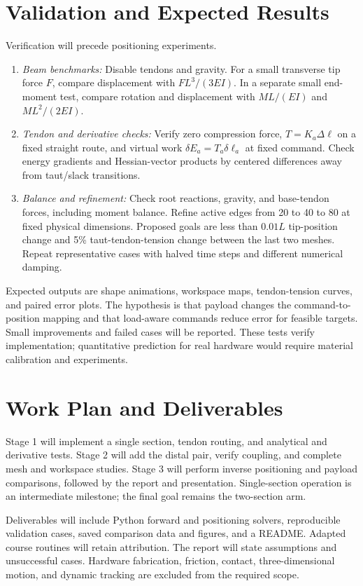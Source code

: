 \documentclass[letterpaper,10pt,conference]{ieeeconf}
\begin{document}
\section{Validation and Expected Results}
Verification will precede positioning experiments.
\begin{enumerate}
\item \textit{Beam benchmarks:} Disable tendons and gravity. For a
small transverse tip force $F$, compare displacement with
$FL^3/(3EI)$. In a separate small end-moment test, compare rotation
and displacement with $ML/(EI)$ and $ML^2/(2EI)$.
\item \textit{Tendon and derivative checks:} Verify zero compression
force, $T=K_a\Delta\ell$ on a fixed straight route, and virtual work
$\delta E_a=T_a\delta\ell_a$ at fixed command. Check energy gradients
and Hessian-vector products by centered differences away from
taut/slack transitions.
\item \textit{Balance and refinement:} Check root reactions, gravity,
and base-tendon forces, including moment balance. Refine active edges
from 20 to 40 to 80 at fixed physical dimensions. Proposed goals are
less than $0.01L$ tip-position change and 5\% taut-tendon-tension
change between the last two meshes. Repeat representative cases with
halved time steps and different numerical damping.
\end{enumerate}
Expected outputs are shape animations, workspace maps, tendon-tension
curves, and paired error plots. The hypothesis is that payload changes
the command-to-position mapping and that load-aware commands reduce
error for feasible targets. Small improvements and failed cases will
be reported. These tests verify implementation; quantitative prediction
for real hardware would require material calibration and experiments.

\section{Work Plan and Deliverables}
Stage 1 will implement a single section, tendon routing, and analytical
and derivative tests. Stage 2 will add the distal pair, verify coupling,
and complete mesh and workspace studies. Stage 3 will perform inverse
positioning and payload comparisons, followed by the report and
presentation. Single-section operation is an intermediate milestone;
the final goal remains the two-section arm.

Deliverables will include Python forward and positioning solvers,
reproducible validation cases, saved comparison data and figures, and
a README. Adapted course routines will retain attribution. The report
will state assumptions and unsuccessful cases. Hardware fabrication,
friction, contact, three-dimensional motion, and dynamic tracking are
excluded from the required scope.
\end{document}
